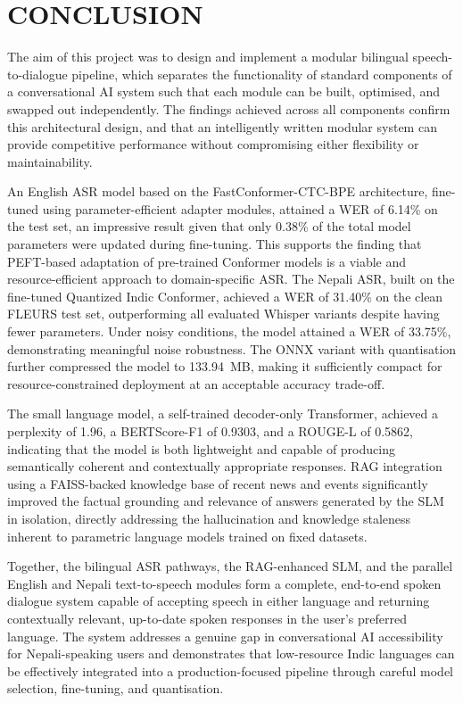 \newpage
\section{\MakeUppercase{Conclusion}}

The aim of this project was to design and implement a modular bilingual speech-to-dialogue pipeline, which separates the functionality of standard components of a conversational AI system such that each module can be built, optimised, and swapped out independently. The findings achieved across all components confirm this architectural design, and that an intelligently written modular system can provide competitive performance without compromising either flexibility or maintainability.

An English ASR model based on the FastConformer-CTC-BPE architecture, fine-tuned using parameter-efficient adapter modules, attained a WER of 6.14\% on the test set, an impressive result given that only 0.38\% of the total model parameters were updated during fine-tuning. This supports the finding that PEFT-based adaptation of pre-trained Conformer models is a viable and resource-efficient approach to domain-specific ASR. The Nepali ASR, built on the fine-tuned Quantized Indic Conformer, achieved a WER of 31.40\% on the clean FLEURS test set, outperforming all evaluated Whisper variants despite having fewer parameters. Under noisy conditions, the model attained a WER of 33.75\%, demonstrating meaningful noise robustness. The ONNX variant with quantisation further compressed the model to 133.94~MB, making it sufficiently compact for resource-constrained deployment at an acceptable accuracy trade-off.

The small language model, a self-trained decoder-only Transformer, achieved a perplexity of 1.96, a BERTScore-F1 of 0.9303, and a ROUGE-L of 0.5862, indicating that the model is both lightweight and capable of producing semantically coherent and contextually appropriate responses. RAG integration using a FAISS-backed knowledge base of recent news and events significantly improved the factual grounding and relevance of answers generated by the SLM in isolation, directly addressing the hallucination and knowledge staleness inherent to parametric language models trained on fixed datasets.

Together, the bilingual ASR pathways, the RAG-enhanced SLM, and the parallel English and Nepali text-to-speech modules form a complete, end-to-end spoken dialogue system capable of accepting speech in either language and returning contextually relevant, up-to-date spoken responses in the user's preferred language. The system addresses a genuine gap in conversational AI accessibility for Nepali-speaking users and demonstrates that low-resource Indic languages can be effectively integrated into a production-focused pipeline through careful model selection, fine-tuning, and quantisation.

